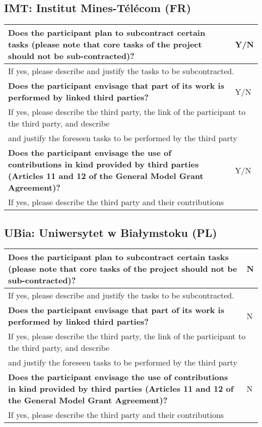\subsection{IMT: Institut Mines-Télécom (FR)}

\begin{longtable}{|p{}|p{}|}
\hline
{\bf Does the participant plan to subcontract certain tasks (please
  note that core tasks of the project should not be sub-contracted)?}
&
Y/N
\\
\hline
\multicolumn{2}{|l|}{
If yes, please describe and justify the tasks to be subcontracted.}
\\
\hline
{\bf Does the participant envisage that  part of its work is performed
  by linked third parties?}
&
Y/N
\\
\hline
\multicolumn{2}{|l|}{If yes, please describe the third party, the link of the
  participant to the third party, and describe}\\
\multicolumn{2}{|l|}{and justify the foreseen
tasks to be performed by the third party}
\\
\hline
{\bf Does the participant envisage the use of contributions in kind
provided by third parties (Articles 11 and 12 of the General Model
Grant Agreement)?}
&
Y/N
\\
\hline
\multicolumn{2}{|l|}{If yes, please describe the third party and their contributions}
\\
\hline
\end{longtable}

\subsection{UBia: Uniwersytet w Białymstoku (PL)}

\begin{longtable}{|p{}|p{}|}
\hline
{\bf Does the participant plan to subcontract certain tasks (please
  note that core tasks of the project should not be sub-contracted)?}
&
N
\\
\hline
\multicolumn{2}{|l|}{
If yes, please describe and justify the tasks to be subcontracted.}
\\
\hline
{\bf Does the participant envisage that  part of its work is performed
  by linked third parties?}
&
N
\\
\hline
\multicolumn{2}{|l|}{If yes, please describe the third party, the link of the
  participant to the third party, and describe}\\
\multicolumn{2}{|l|}{and justify the foreseen
tasks to be performed by the third party}
\\
\hline
{\bf Does the participant envisage the use of contributions in kind
provided by third parties (Articles 11 and 12 of the General Model
Grant Agreement)?}
&
N
\\
\hline
\multicolumn{2}{|l|}{If yes, please describe the third party and their contributions}
\\
\hline
\end{longtable}


